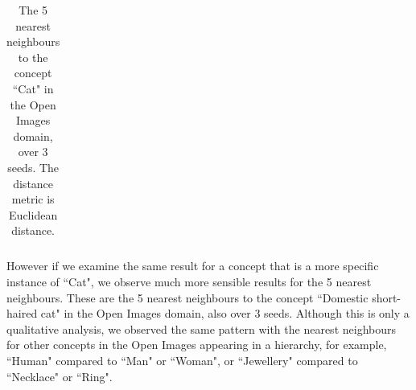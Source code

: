 \begin{table}[H]
\begin{tabular}{@{}lllll@{}}
\end{tabular}
\centering
\caption{\label{table:cat}The 5 nearest neighbours to the concept ``Cat" in the Open Images domain, over 3 seeds. The distance metric is Euclidean distance.}
\end{table}

However if we examine the same result for a concept that is a more specific instance of ``Cat", we observe much more sensible results for the 5 nearest neighbours. These are the 5 nearest neighbours to the concept ``Domestic short-haired cat" in the Open Images domain, also over 3 seeds. Although this is only a qualitative analysis, we observed the same pattern with the nearest neighbours for other concepts in the Open Images appearing in a hierarchy, for example, ``Human" compared to ``Man" or ``Woman", or ``Jewellery" compared to ``Necklace" or ``Ring". 


